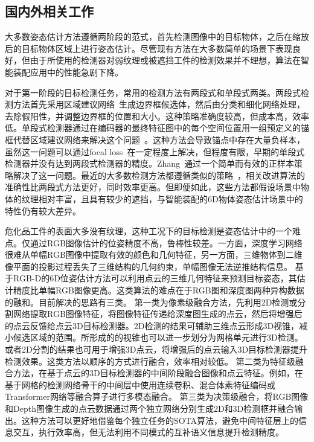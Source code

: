\documentclass[12pt]{article}
\begin{document}
\subsection{国内外相关工作}

大多数姿态估计方法遵循两阶段的范式，首先检测图像中的目标物体，之后在缩放后的目标物体区域上进行姿态估计。尽管现有方法在大多数简单的场景下表现良好，但由于所使用的检测器对弱纹理或被遮挡工件的检测效果并不理想，算法在智能装配应用中的性能急剧下降。

对于第一阶段的目标检测任务，常用的检测方法有两段式和单段式两类\cite{ATSS, fcos, PAA, faster-rcnn, maskrcnn}。两段式检测方法首先采用区域建议网络~\cite{faster-rcnn, maskrcnn}生成边界框候选体，然后由分类和细化网络处理，去除假阳性，并调整边界框的位置和大小。这种策略准确度较高，但成本高，效率低。单段式检测器通过在编码器的最终特征图中的每个空间位置用一组预定义的锚框代替区域建议网络来解决这个问题~\cite{fcos,retinanet,yolov1}。这种方法会导致锚点中存在大量负样本，虽然这一问题可以通过focal loss~\cite{retinanet,fpn}在一定程度上解决，但程度有限，早期的单段式检测器并没有达到两段式检测器的精度。Zhang~\cite{ATSS}通过一个简单而有效的正样本策略解决了这一问题。最近的大多数检测方法都遵循类似的策略~\cite{PAA, autoassign, OTA, TTF, yolov3}，相关改进算法的准确性比两段式方法更好，同时效率更高。但即便如此，这些方法都假设场景中物体的纹理相对丰富，且具有较少的遮挡，与智能装配的6D物体姿态估计场景中的特性仍有较大差异。

危化品工件的表面大多没有纹理，这种工况下的目标检测是姿态估计中的一个难点。仅通过RGB图像估计的位姿精度不高，鲁棒性较差。一方面，深度学习网络很难从单幅RGB图像中提取有效的颜色和几何特征，另一方面，三维物体到二维像平面的投影过程丢失了三维结构的几何约束，单幅图像无法逆推结构信息。
基于RGB-D的6D位姿估计方法可以利用点云的三维几何特征来预测目标姿态，其估计精度比单幅RGB图像更高。这类算法的难点在于RGB图和深度图两种异构数据的融和。目前解决的思路有三类。
第一类为像素级融合方法，先利用2D检测或分割网络提取RGB图像特征，将图像特征传递给深度图生成的点云，然后将增强后的点云反馈给点云3D目标检测器。2D检测的结果可辅助三维点云形成3D视锥\cite{Qi2018}，减小候选区域的范围。所形成的的视锥也可以进一步划分为网格单元\cite{Wang2019}进行3D检测。或者2D分割的结果也可用于增强3D点云\cite{Vora2020}，将增强后的点云输入3D目标检测器提升检测效果。这类方法以顺序的方式进行融合，效率相对较低。
第二类为特征级融合方法，在基于点云的3D目标检测器的中间阶段融合图像和点云特征。例如，在基于网格的检测网络骨干的中间层中使用连续卷积\cite{Liang2018, Liang2019}、混合体素特征编码\cite{Sindagi2019}或Transformer\cite{Zhang2022}网络等融合算子进行多模态融合。
第三类为决策级融合，将RGB图像和Depth图像生成的点云数据通过两个独立网络分别生成2D和3D检测框\cite{Asvadi2018}并融合输出。这种方法可以更好地借鉴每个独立任务的SOTA算法，避免中间特征层上的信息交互，执行效率高，但无法利用不同模式的互补语义信息\cite{Pang2020}提升检测精度。
\end{document}
